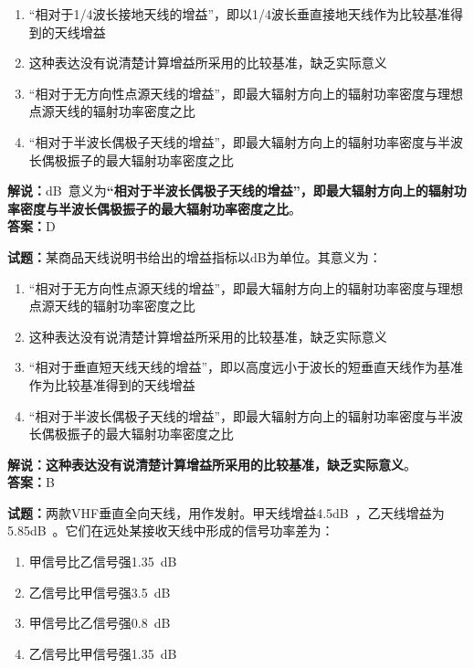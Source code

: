 \documentclass{ctexbook}
\begin{document}
\begin{enumerate}[leftmargin=3em]
  \item “相对于1/4波长接地天线的增益”，即以1/4波长垂直接地天线作为比较基准得到的天线增益
  \item 这种表达没有说清楚计算增益所采用的比较基准，缺乏实际意义
  \item “相对于无方向性点源天线的增益”，即最大辐射方向上的辐射功率密度与理想点源天线的辐射功率密度之比
  \item “相对于半波长偶极子天线的增益”，即最大辐射方向上的辐射功率密度与半波长偶极振子的最大辐射功率密度之比
\end{enumerate}

\noindent\textbf{解说：}\unit[qualifier-mode=combine]{\deci\bel{}}意义为\textbf{“相对于半波长偶极子天线的增益”，即最大辐射方向上的辐射功率密度与半波长偶极振子的最大辐射功率密度之比}。\\\noindent\textbf{答案：}D

\bigskip

\noindent\textbf{试题：}某商品天线说明书给出的增益指标以\unit{\dB}为单位。其意义为：

\begin{enumerate}[leftmargin=3em]
  \item “相对于无方向性点源天线的增益”，即最大辐射方向上的辐射功率密度与理想点源天线的辐射功率密度之比
  \item 这种表达没有说清楚计算增益所采用的比较基准，缺乏实际意义
  \item “相对于垂直短天线天线的增益”，即以高度远小于波长的短垂直天线作为基准作为比较基准得到的天线增益
  \item “相对于半波长偶极子天线的增益”，即最大辐射方向上的辐射功率密度与半波长偶极振子的最大辐射功率密度之比
\end{enumerate}

\noindent\textbf{解说：这种表达没有说清楚计算增益所采用的比较基准，缺乏实际意义}。\\\noindent\textbf{答案：}B

\bigskip

\noindent\textbf{试题：}两款VHF垂直全向天线，用作发射。甲天线增益\num{4.5}\unit[qualifier-mode=combine]{\deci\bel{}}，乙天线增益为\num{5.85}\unit[qualifier-mode=combine]{\deci\bel{}}。它们在远处某接收天线中形成的信号功率差为：

\begin{enumerate}[leftmargin=3em]
  \item 甲信号比乙信号强\qty{1.35}{\dB}
  \item 乙信号比甲信号强\qty{3.5}{\dB}
  \item 甲信号比乙信号强\qty{0.8}{\dB}
  \item 乙信号比甲信号强\qty{1.35}{\dB}
\end{enumerate}
\end{document}
